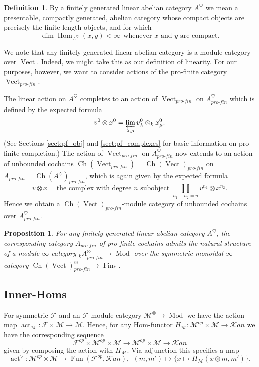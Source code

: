 \documentclass[reqno]{amsart}
\newtheorem{proposition}[lemma]{Proposition}
\theoremstyle{definition}
\newtheorem{definition}[lemma]{Definition}
\newcommand{\msc}[1]{\mathscr{#1}}
\newcommand{\opn}[1]{\operatorname{#1}}
\newcommand{\ot}{\otimes}
\newcommand{\sKan}{\msc{K}\!an}
\newcommand{\pf}{pro\text{-}fin}
\DeclareMathOperator{\Hom}{Hom}
\DeclareMathOperator{\Fun}{Fun}
\DeclareMathOperator{\Fin}{Fin}
\renewcommand{\1}{\mathbf{1}}
\begin{document}
\begin{definition}\label{def:lin_ab}
By a finitely generated linear abelian category $A^{\heartsuit}$ we mean a presentable, compactly generated, abelian category whose compact objects are precisely the finite length objects, and for which
\[
\opn{dim}\Hom_{A^{\heartsuit}}(x,y)<\infty\ \ \text{whenever $x$ and $y$ are compact}.
\]
\end{definition}

We note that any finitely generated linear abelian category is a module category over $\opn{Vect}$.  Indeed, we might take this as our definition of linearity.  For our purposes, however, we want to consider actions of the pro-finite category $\opn{Vect}_{\pf}$.
\par

The linear action on $A^{\heartsuit}$ completes to an action of $\opn{Vect}_{\pf}$ on $A^{\heartsuit}_{\pf}$ which is defined by the expected formula
\[
v^0\ot x^0=\varprojlim_{\lambda,\mu}v^0_{\lambda}\ot_k x^0_{\mu}.
\]
(See Sections \ref{sect:pf_obj} and \ref{sect:pf_complexes} for basic information on pro-finite completion.) The action of $\opn{Vect}_{\pf}$ on $A^{\heartsuit}_{\pf}$ now extends to an action of unbounded cochains $\opn{Ch}(\opn{Vect}_{\pf})=\opn{Ch}(\opn{Vect})_{\pf}$ on $A_{\pf}=\opn{Ch}(A^{\heartsuit})_{\pf}$, which is again given by the expected formula
\[
v\ot x=\text{the complex with degree $n$ subobject }\prod_{n_1+n_2=n}v^{n_1}\ot x^{n_2}.
\]
Hence we obtain a $\opn{Ch}(\opn{Vect})_{\pf}$-module category of unbounded cochains over $A^{\heartsuit}_{\pf}$.

\begin{proposition}
For any finitely generated linear abelian category $A^{\heartsuit}$, the corresponding category $A_{\pf}$ of pro-finite cochains admits the natural structure of a module $\infty$-category ${_kA}^{\ot}_{\pf}\to \opn{Mod}$ over the symmetric monoidal $\infty$-category $\opn{Ch}(\opn{Vect})_{\pf}^{\ot}\to \Fin_{\ast}$.
\end{proposition}

\subsection{Inner-Homs}

For symmetric $\msc{F}$ and an $\msc{F}$-module category $\msc{M}^{\ot}\to \opn{Mod}$ we have the action map $\opn{act}_{\msc{M}}:\msc{F}\times \msc{M}\to \msc{M}$.  Hence, for any Hom-functor $H_{\msc{M}}:\msc{M}^{op}\times\msc{M}\to \sKan$ we have the corresponding sequence
\[
\msc{F}^{op}\times \msc{M}^{op}\times \msc{M}\to \msc{M}^{op}\times \msc{M}\to \sKan
\]
given by composing the action with $H_{\msc{M}}$.  Via adjunction this specifies a map
\[
\opn{act}^{\vee}:\msc{M}^{op}\times \msc{M}\to \Fun(\msc{F}^{op},\sKan),\ \ (m,m')\mapsto \{x\mapsto H_{\msc{M}}(x\ot m,m')\}.
\]
\end{document}
